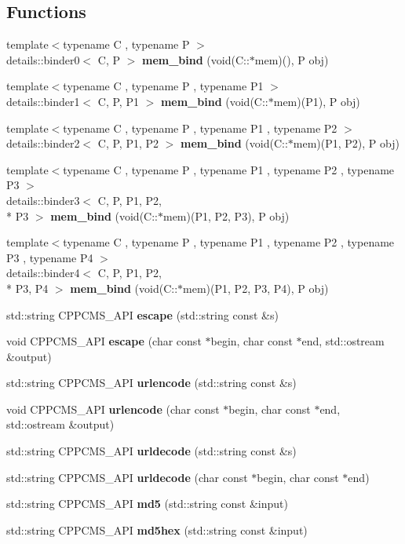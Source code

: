 \subsection*{Functions}
\begin{DoxyCompactItemize}
\item 
{\footnotesize template$<$typename C , typename P $>$ }\\details\-::binder0$<$ C, P $>$ {\bf mem\-\_\-bind} (void(C\-::$\ast$mem)(), P obj)
\item 
{\footnotesize template$<$typename C , typename P , typename P1 $>$ }\\details\-::binder1$<$ C, P, P1 $>$ {\bf mem\-\_\-bind} (void(C\-::$\ast$mem)(P1), P obj)
\item 
{\footnotesize template$<$typename C , typename P , typename P1 , typename P2 $>$ }\\details\-::binder2$<$ C, P, P1, P2 $>$ {\bf mem\-\_\-bind} (void(C\-::$\ast$mem)(P1, P2), P obj)
\item 
{\footnotesize template$<$typename C , typename P , typename P1 , typename P2 , typename P3 $>$ }\\details\-::binder3$<$ C, P, P1, P2, \\*
P3 $>$ {\bf mem\-\_\-bind} (void(C\-::$\ast$mem)(P1, P2, P3), P obj)
\item 
{\footnotesize template$<$typename C , typename P , typename P1 , typename P2 , typename P3 , typename P4 $>$ }\\details\-::binder4$<$ C, P, P1, P2, \\*
P3, P4 $>$ {\bf mem\-\_\-bind} (void(C\-::$\ast$mem)(P1, P2, P3, P4), P obj)
\item 
std\-::string C\-P\-P\-C\-M\-S\-\_\-\-A\-P\-I {\bf escape} (std\-::string const \&s)
\item 
void C\-P\-P\-C\-M\-S\-\_\-\-A\-P\-I {\bf escape} (char const $\ast$begin, char const $\ast$end, std\-::ostream \&output)
\item 
std\-::string C\-P\-P\-C\-M\-S\-\_\-\-A\-P\-I {\bf urlencode} (std\-::string const \&s)
\item 
void C\-P\-P\-C\-M\-S\-\_\-\-A\-P\-I {\bf urlencode} (char const $\ast$begin, char const $\ast$end, std\-::ostream \&output)
\item 
std\-::string C\-P\-P\-C\-M\-S\-\_\-\-A\-P\-I {\bf urldecode} (std\-::string const \&s)
\item 
std\-::string C\-P\-P\-C\-M\-S\-\_\-\-A\-P\-I {\bf urldecode} (char const $\ast$begin, char const $\ast$end)
\item 
std\-::string C\-P\-P\-C\-M\-S\-\_\-\-A\-P\-I {\bf md5} (std\-::string const \&input)
\item 
std\-::string C\-P\-P\-C\-M\-S\-\_\-\-A\-P\-I {\bf md5hex} (std\-::string const \&input)
\end{DoxyCompactItemize}


